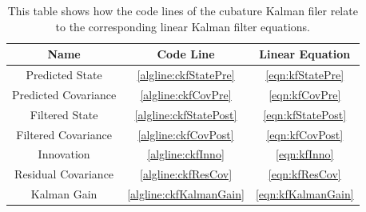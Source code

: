 		\begin{table}
			\centering
			\begin{tabular}{c|c|c}
				   \textbf{Name}     &     \textbf{Code Line}      & \textbf{Linear Equation} \\ \hline
				  Predicted State    &  \ref{algline:ckfStatePre}  &  \eqref{eqn:kfStatePre}  \\
				Predicted Covariance &   \ref{algline:ckfCovPre}   &   \eqref{eqn:kfCovPre}   \\
				   Filtered State    & \ref{algline:ckfStatePost}  & \eqref{eqn:kfStatePost}  \\
				Filtered Covariance  &  \ref{algline:ckfCovPost}   &  \eqref{eqn:kfCovPost}   \\
				     Innovation      &    \ref{algline:ckfInno}    &    \eqref{eqn:kfInno}    \\
				Residual Covariance  &   \ref{algline:ckfResCov}   &   \eqref{eqn:kfResCov}   \\
				    Kalman Gain      & \ref{algline:ckfKalmanGain} & \eqref{eqn:kfKalmanGain}
			\end{tabular}
			\caption{This table shows how the code lines of the cubature Kalman filer relate to the corresponding linear Kalman filter equations.}
			\label{tab:cubatureKalmanFilter}
		\end{table}

